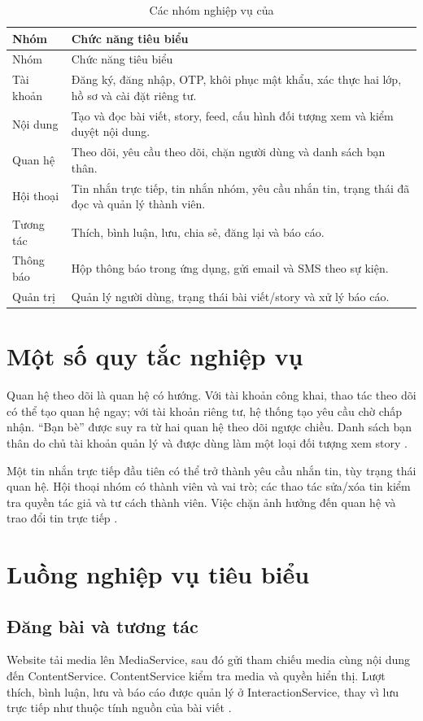 \begin{longtable}{p{}p{}}
\caption{Các nhóm nghiệp vụ của \project{}}\\
\toprule
Nhóm & Chức năng tiêu biểu \\
\midrule
\endfirsthead
\toprule Nhóm & Chức năng tiêu biểu \\ \midrule
\endhead
Tài khoản & Đăng ký, đăng nhập, OTP, khôi phục mật khẩu, xác thực hai lớp, hồ sơ và cài đặt riêng tư. \\
Nội dung & Tạo và đọc bài viết, story, feed, cấu hình đối tượng xem và kiểm duyệt nội dung. \\
Quan hệ & Theo dõi, yêu cầu theo dõi, chặn người dùng và danh sách bạn thân. \\
Hội thoại & Tin nhắn trực tiếp, tin nhắn nhóm, yêu cầu nhắn tin, trạng thái đã đọc và quản lý thành viên. \\
Tương tác & Thích, bình luận, lưu, chia sẻ, đăng lại và báo cáo. \\
Thông báo & Hộp thông báo trong ứng dụng, gửi email và SMS theo sự kiện. \\
Quản trị & Quản lý người dùng, trạng thái bài viết/story và xử lý báo cáo. \\
\bottomrule
\end{longtable}

\section{Một số quy tắc nghiệp vụ}
Quan hệ theo dõi là quan hệ có hướng. Với tài khoản công khai, thao tác theo dõi có thể tạo quan hệ ngay; với tài khoản riêng tư, hệ thống tạo yêu cầu chờ chấp nhận. ``Bạn bè'' được suy ra từ hai quan hệ theo dõi ngược chiều. Danh sách bạn thân do chủ tài khoản quản lý và được dùng làm một loại đối tượng xem story \cite{relationship}.

Một tin nhắn trực tiếp đầu tiên có thể trở thành yêu cầu nhắn tin, tùy trạng thái quan hệ. Hội thoại nhóm có thành viên và vai trò; các thao tác sửa/xóa tin kiểm tra quyền tác giả và tư cách thành viên. Việc chặn ảnh hưởng đến quan hệ và trao đổi tin trực tiếp \cite{relationship}.

\section{Luồng nghiệp vụ tiêu biểu}
\subsection{Đăng bài và tương tác}
Website tải media lên MediaService, sau đó gửi tham chiếu media cùng nội dung đến ContentService. ContentService kiểm tra media và quyền hiển thị. Lượt thích, bình luận, lưu và báo cáo được quản lý ở InteractionService, thay vì lưu trực tiếp như thuộc tính nguồn của bài viết \cite{catalog}.
